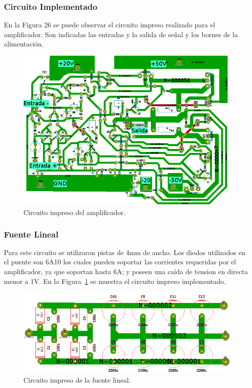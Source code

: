 \subsubsection{Circuito Implementado}

En la Figura 26 se puede observar el circuito impreso realizado para el amplificador. Son indicadas las entradas y la salida de señal y los bornes de la alimentación.

\begin{figure}[H]
\centerline{
\includegraphics[width=1\textwidth]
{img/PCB1.png}}
\caption{Circuito impreso del amplificador.}
\end{figure}

\subsubsection{Fuente Lineal}
\medskip
Para este circuito se utilizaron pistas de 4mm de ancho. Los diodos utilizados en el puente son 6A10 los cuales pueden soportar las corrientes requeridas por el amplificador, ya que soportan hasta 6A; y poseen una caída de tension en directa menor a 1V.
En la Figura~\ref{circuito_impreso_fuente_lineal} se muestra el circuito impreso implementado. 



\begin{figure}[H]
\centering
\centerline{\includegraphics[width=1\textwidth]{img/circuito_impreso_fuente_lineal.png}}
\caption{Circuito impreso de la fuente lineal.}
\label{circuito_impreso_fuente_lineal} 
\end{figure}
\medskip
